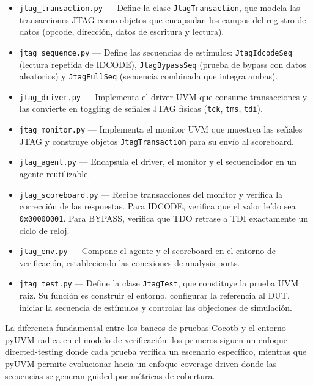 \begin{itemize}
    \item \texttt{jtag\_transaction.py} — Define la clase \texttt{JtagTransaction}, que modela las transacciones JTAG como objetos que encapsulan los campos del registro de datos (opcode, dirección, datos de escritura y lectura).

    \item \texttt{jtag\_sequence.py} — Define las secuencias de estímulos: \texttt{JtagIdcodeSeq} (lectura repetida de IDCODE), \texttt{JtagBypassSeq} (prueba de bypass con datos aleatorios) y \texttt{JtagFullSeq} (secuencia combinada que integra ambas).

    \item \texttt{jtag\_driver.py} — Implementa el driver UVM que consume transacciones y las convierte en toggling de señales JTAG físicas (\texttt{tck}, \texttt{tms}, \texttt{tdi}).

    \item \texttt{jtag\_monitor.py} — Implementa el monitor UVM que muestrea las señales JTAG y construye objetos \texttt{JtagTransaction} para su envío al scoreboard.

    \item \texttt{jtag\_agent.py} — Encapsula el driver, el monitor y el secuenciador en un agente reutilizable.

    \item \texttt{jtag\_scoreboard.py} — Recibe transacciones del monitor y verifica la corrección de las respuestas. Para IDCODE, verifica que el valor leído sea \texttt{0x00000001}. Para BYPASS, verifica que TDO retrase a TDI exactamente un ciclo de reloj.

    \item \texttt{jtag\_env.py} — Compone el agente y el scoreboard en el entorno de verificación, estableciendo las conexiones de analysis ports.

    \item \texttt{jtag\_test.py} — Define la clase \texttt{JtagTest}, que constituye la prueba UVM raíz. Su función es construir el entorno, configurar la referencia al DUT, iniciar la secuencia de estímulos y controlar las objeciones de simulación.
\end{itemize}

La diferencia fundamental entre los bancos de pruebas Cocotb y el entorno pyUVM radica en el modelo de verificación: los primeros siguen un enfoque directed-testing donde cada prueba verifica un escenario específico, mientras que pyUVM permite evolucionar hacia un enfoque coverage-driven donde las secuencias se generan guided por métricas de cobertura.

